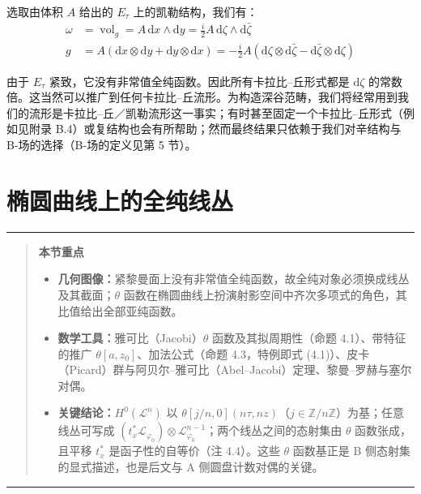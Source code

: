 \documentclass[11pt,a4paper]{article}
\theoremstyle{plain}
\theoremstyle{definition}
\newenvironment{keytakeaways}[1][本节重点]{%
  \par\addvspace{9pt}%
  \noindent\rule{\linewidth}{0.7pt}\par\nobreak
  \begin{quote}\noindent\textbf{#1}\par\small
}{%
  \end{quote}%
  \noindent\rule{\linewidth}{0.7pt}\par\addvspace{7pt}%
}
\begin{document}
选取由体积 $A$ 给出的 $E_\tau$ 上的凯勒结构，我们有：
\[
\begin{aligned}
\omega &= \operatorname{vol}_g = A\,\mathrm{d}x\wedge\mathrm{d}y = \tfrac{i}{2}A\,\mathrm{d}\zeta\wedge\mathrm{d}\bar\zeta\\
g &= A(\mathrm{d}x\otimes\mathrm{d}y+\mathrm{d}y\otimes\mathrm{d}x) = -\tfrac{i}{2}A(\mathrm{d}\zeta\otimes\mathrm{d}\bar\zeta-\mathrm{d}\bar\zeta\otimes\mathrm{d}\zeta)
\end{aligned}
\]

由于 $E_\tau$ 紧致，它没有非常值全纯函数。因此所有卡拉比–丘形式都是 $\mathrm{d}\zeta$ 的常数倍。这当然可以推广到任何卡拉比–丘流形。为构造深谷范畴，我们将经常用到我们的流形是卡拉比–丘／凯勒流形这一事实；有时甚至固定一个卡拉比–丘形式（例如见附录 B.4）或复结构也会有所帮助；然而最终结果只依赖于我们对辛结构与 B-场的选择（B-场的定义见第 5 节）。

\section{椭圆曲线上的全纯线丛}

\begin{keytakeaways}
\begin{itemize}
  \item \textbf{几何图像：}紧黎曼面上没有非常值全纯函数，故全纯对象必须换成线丛及其截面；$\theta$ 函数在椭圆曲线上扮演射影空间中齐次多项式的角色，其比值给出全部亚纯函数。
  \item \textbf{数学工具：}雅可比（Jacobi）$\theta$ 函数及其拟周期性（命题 4.1）、带特征的推广 $\theta[a,z_0]$、加法公式（命题 4.3，特例即式 (4.1)）、皮卡（Picard）群与阿贝尔–雅可比（Abel--Jacobi）定理、黎曼–罗赫与塞尔对偶。
  \item \textbf{关键结论：}$H^0(\mathcal{L}^n)$ 以 $\theta[j/n,0](n\tau,nz)$（$j\in\mathbb{Z}/n\mathbb{Z}$）为基；任意线丛可写成 $(t_x^*\mathcal{L}_{\varphi_0})\otimes\mathcal{L}_{\varphi_0}^{n-1}$；两个线丛之间的态射集由 $\theta$ 函数张成，且平移 $t_x^*$ 是函子性的自等价（注 4.4）。这些 $\theta$ 函数基正是 B 侧态射集的显式描述，也是后文与 A 侧圆盘计数对偶的关键。
\end{itemize}
\end{keytakeaways}
\end{document}
